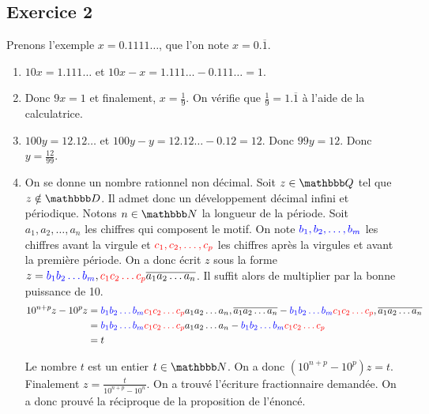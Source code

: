 \documentclass[a4paper,12pt, french, noSujetB]{article}
\begin{document}
\vspace{-7mm}
\subsection*{Exercice 2}
Prenons l'exemple $x = 0.1111\dots$, que l'on note $x = 0.\overline{1}$.
\begin{enumerate}
    \item $10x = 1.111\dots$ et $10x-x = 1.111\dots-0.111\dots=1$.
    \item Donc $9x=1$ et finalement, $x=\frac{1}{9}$. On vérifie que $\frac{1}{9}=1.\overline{1}$ à l'aide de la calculatrice.
    \item $100y = 12.12\dots$ et $100y-y = 12.12\dots-0.12=12$. Donc $99y=12$. Donc $y=\frac{12}{99}$.
    \item On se donne un nombre rationnel non décimal. Soit $z\in\Q$ tel que $z\notin\D$. Il admet donc un développement décimal infini et périodique. Notons $n\in\N$ la longueur de la période. Soit $a_1, a_2, \dots, a_n$ les chiffres qui composent le motif. On note $\textcolor{blue}{b_1, b_2, \dots, b_m}$ les chiffres avant la virgule et $\textcolor{red}{c_1, c_2, \dots, c_p}$ les chiffres après la virgules et avant la première période. On a donc écrit $z$ sous la forme $z=\textcolor{blue}{b_1b_2\dots b_m}
,\textcolor{red}{c_1c_2\dots c_p}
\overline{a_1a_2\dots a_n}$. Il suffit alors de multiplier par la bonne puissance de 10.
    \begin{align*}
10^{n+p} z-10^p z
&= \textcolor{blue}{b_1b_2\dots b_m}
\textcolor{red}{c_1c_2\dots c_p}
 a_1a_2\dots a_n,\overline{a_1a_2\dots a_n} - \textcolor{blue}{b_1b_2\dots b_m}
\textcolor{red}{c_1c_2\dots c_p}
,\overline{a_1a_2\dots a_n}\\
&= \textcolor{blue}{b_1b_2\dots b_m}
\textcolor{red}{c_1c_2\dots c_p}
 a_1a_2\dots a_n-\textcolor{blue}{b_1b_2\dots b_m}
\textcolor{red}{c_1c_2\dots c_p}\\
&= t
    \end{align*}

    Le nombre $t$ est un entier $t\in\N$. On a donc $(10^{n+p} -10^p)z=t$. Finalement $z=\frac{t}{10^{n+p}-10^n}$. On a trouvé l'écriture fractionnaire demandée. On a donc prouvé la réciproque de la proposition de l'énoncé.
\end{enumerate}
\end{document}
